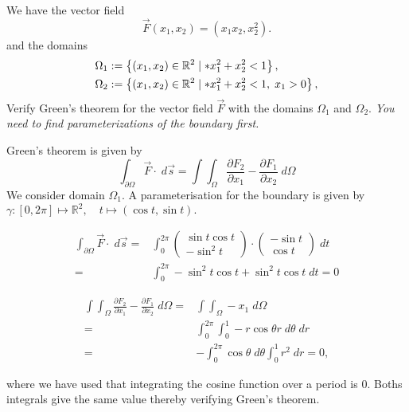 \documentclass[11pt]{article}
\begin{document}
\begin{exercise}
    We have the vector field 
    \[
        \vec F( x_1, x_2 ) = \left( x_1 x_2, x_2^{2} \right).
    \]
    and the domains 
    \begin{align*}
        \Omega_1 &:= \left\{ (x_1,x_2) \in \bbR^{2} \suchthat* x_1^{2} + x_2^{2} < 1 \right\},
        \\
        \Omega_2 &:= \left\{ (x_1,x_2) \in \bbR^{2} \suchthat* x_1^{2} + x_2^{2} < 1, \; x_1 > 0 \right\},
     \end{align*}
    Verify Green's theorem for the vector field $\vec F$ with the domains $\Omega_1$ and $\Omega_2$. 
    \textit{You need to find parameterizations of the boundary first.}
\end{exercise}
\begin{solution}   
   Green's theorem is given by $$\int_{\partial \Omega} \vec{F} \cdot \;d\vec{s} = \int \int_{\Omega} \frac{\partial F_2}{\partial x_1} - \frac{\partial F_1}{\partial x_2} \;d \Omega$$
We consider domain $\Omega_1$. A parameterisation for the boundary is given by $\gamma: [0,2\pi] \mapsto \mathbb{R}^2, \quad t\mapsto  (\cos t, \sin t).$

\begin{align*}
\int_{\partial \Omega} \vec{F} \cdot \;d\vec{s} =& \int_0^ {2\pi} \begin{pmatrix}\sin t \cos t\\ -\sin^2 t \end{pmatrix} \cdot \begin{pmatrix}-\sin t \\ \cos t \end{pmatrix} \; d t \\
=& \int_0^{2\pi} -\sin^2 t\cos t + \sin^ 2 t \cos t \;dt = 0
\end{align*}

\begin{align*}
\int \int_{\Omega} \frac{\partial F_2}{\partial x_1} - \frac{\partial F_1}{\partial x_2} \;d \Omega =& \int \int_{\Omega} -x_1 \; d\Omega\\
=& \int_0^ {2\pi} \int_0^1 -r\cos \theta r \;d\theta\;dr\\
=& -\int_0^ {2\pi} \cos \theta \;d \theta \int_0^1 r^ 2 \;d r = 0,
\end{align*}

where we have used that integrating the cosine function over a period is $0$. Boths integrals give the same value thereby verifying Green's theorem.\\


\end{solution}
\end{document}
